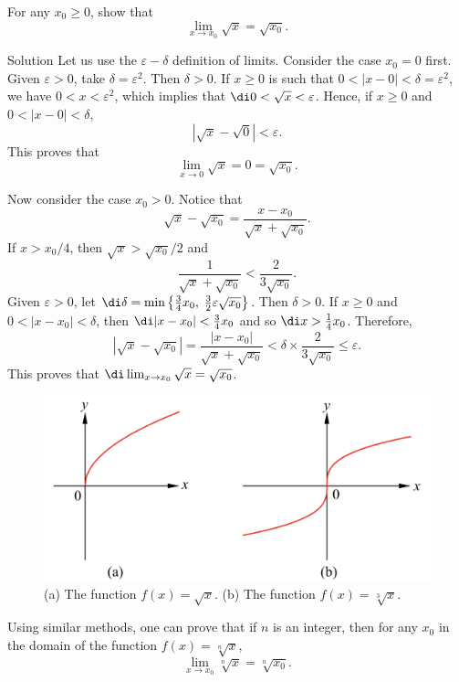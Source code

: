 \begin{example}[label=23020901]{}
For any $x_0\geq 0$, show that
\[\lim_{x\rightarrow x_0}\sqrt{x}=\sqrt{x_0}.\]
\end{example}
\begin{solution}{Solution}
Let us use the $\varepsilon-\delta$ definition of limits. 
Consider the case $x_0=0$ first. Given $\varepsilon>0$, take $\delta=\varepsilon^2$. Then $\delta>0$. If $x\geq 0$ is such that $0<|x-0|<\delta=\varepsilon^2$, we have $0<x<\varepsilon^2$, which implies that
$\di 0< \sqrt{x}<\varepsilon$. Hence,  if $x\geq 0$ and $0<|x-0|<\delta$,
\[|\sqrt{x}-\sqrt{0}|<\varepsilon.\] This proves  that
\[\lim_{x\rightarrow 0}\sqrt{x}=0=\sqrt{x_0}.\]

Now consider the case $x_0>0$. 
Notice that
\[\sqrt{x}-\sqrt{x_0}=\frac{x-x_0}{\sqrt{x}+\sqrt{x_0}}.\]
 If $x>x_0/4$, then $\sqrt{x}>\sqrt{x_0}/2$ and
 \[\frac{1}{\sqrt{x}+\sqrt{x_0}}<\frac{2}{3\sqrt{x_0}}.\]
Given $\varepsilon>0$, let
$\di \delta=\min\left\{\frac{3}{4}x_0,\; \frac{3}{2}\varepsilon\sqrt{x_0} \right\}$.
Then $\delta>0$. If $x\geq 0$ and $0<|x-x_0|<\delta$, then $\di |x-x_0|<\frac{3}{4}x_0$ and so $\di x>\frac{1}{4}x_0$. 
Therefore,\bs
\[\left|\sqrt{x}-\sqrt{x_0}\right|=\frac{|x-x_0|}{\sqrt{x}+\sqrt{x_0}}<\delta\times \frac{2}{3\sqrt{x_0}}\leq\varepsilon.\]
This proves that 
$\di \lim_{x\rightarrow x_0}\sqrt{x} =\sqrt{x_0}$.
\end{solution}

\begin{figure}[ht]
\centering
\includegraphics[scale=0.2]{Picture7.png}
\caption{  (a) The function $f(x)=\sqrt{x}$. (b) The function $f(x)=\sqrt[3]{x}$.}\label{figure7}
\end{figure}

Using similar methods, one can prove that  if $n$ is an   integer,   then for any $x_0$ in the domain of the function $f(x)=\sqrt[n]{x}$,
\[\lim_{x\rightarrow x_0}\sqrt[n]{x}= \sqrt[n]{x_0}.\]
 

